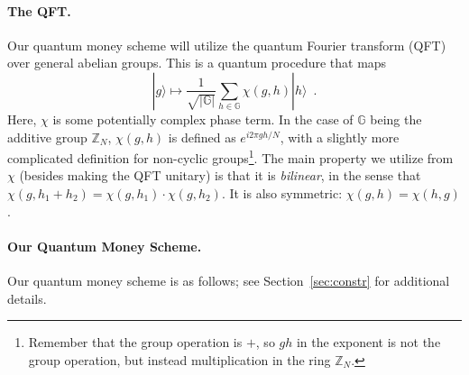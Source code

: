 \documentclass{article}\usepackage[a4paper,margin=20mm]{geometry}
\numberwithin{theorem}{section}
\numberwithin{equation}{section}
\newcommand{\Z}{\mathbb{Z}}
\newcommand{\G}{\mathbb{G}}
\begin{document}
\paragraph{The QFT.} Our quantum money scheme will utilize the quantum Fourier transform (QFT) over general abelian groups. This is a quantum procedure that maps
\[|g\rangle\mapsto\frac{1}{\sqrt{|\G|}}\sum_{h\in\G}\chi(g,h)|h\rangle\enspace .\]
Here, $\chi$ is some potentially complex phase term. In the case of $\G$ being the additive group $\Z_N$, $\chi(g,h)$ is defined as $e^{i2\pi gh/N}$, with a slightly more complicated definition for non-cyclic groups\footnote{Remember that the group operation is $+$, so $gh$ in the exponent is not the group operation, but instead multiplication in the ring $\Z_N$.}. The main property we utilize from $\chi$ (besides making the QFT unitary) is that it is \emph{bilinear}, in the sense that $\chi(g,h_1+ h_2)=\chi(g,h_1)\cdot\chi(g,h_2)$. It is also symmetric: $\chi(g,h)=\chi(h,g)$.


\paragraph{Our Quantum Money Scheme.} Our quantum money scheme is as follows; see Section~\ref{sec:constr} for additional details.
\end{document}
